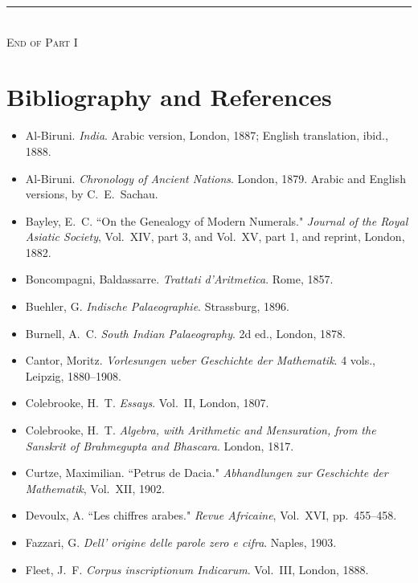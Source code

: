 \documentclass[11pt,a4paper]{article}
\begin{document}
\vfill
\begin{center}
\rule{0.5\textwidth}{0.4pt}\\[0.5cm]
{\small \textsc{End of Part I}}
\end{center}

\newpage

\section*{Bibliography and References}

\begin{footnotesize}
\begin{itemize}[leftmargin=2em,label={},itemsep=0.5ex]
\item Al-Biruni. \textit{India}. Arabic version, London, 1887; English translation, ibid., 1888.
\item Al-Biruni. \textit{Chronology of Ancient Nations}. London, 1879. Arabic and English versions, by C.\ E.\ Sachau.
\item Bayley, E.\ C. ``On the Genealogy of Modern Numerals." \textit{Journal of the Royal Asiatic Society}, Vol.\ XIV, part 3, and Vol.\ XV, part 1, and reprint, London, 1882.
\item Boncompagni, Baldassarre. \textit{Trattati d'Aritmetica}. Rome, 1857.
\item Buehler, G. \textit{Indische Palaeographie}. Strassburg, 1896.
\item Burnell, A.\ C. \textit{South Indian Palaeography}. 2d ed., London, 1878.
\item Cantor, Moritz. \textit{Vorlesungen ueber Geschichte der Mathematik}. 4 vols., Leipzig, 1880--1908.
\item Colebrooke, H.\ T. \textit{Essays}. Vol.\ II, London, 1807.
\item Colebrooke, H.\ T. \textit{Algebra, with Arithmetic and Mensuration, from the Sanskrit of Brahmegupta and Bhascara}. London, 1817.
\item Curtze, Maximilian. ``Petrus de Dacia." \textit{Abhandlungen zur Geschichte der Mathematik}, Vol.\ XII, 1902.
\item Devoulx, A. ``Les chiffres arabes." \textit{Revue Africaine}, Vol.\ XVI, pp.\ 455--458.
\item Fazzari, G. \textit{Dell' origine delle parole zero e cifra}. Naples, 1903.
\item Fleet, J.\ F. \textit{Corpus inscriptionum Indicarum}. Vol.\ III, London, 1888.

\end{itemize}
\end{footnotesize}
\end{document}
